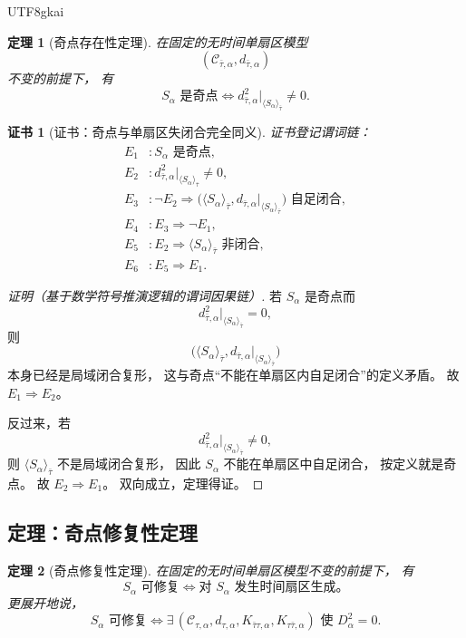 \documentclass[12pt]{article}
\newtheorem{theorem}{定理}[section]
\newtheorem{Certificate}{证书}[section]
\begin{document}
\begin{CJK*}{UTF8}{gkai}
\begin{theorem}[奇点存在性定理]
\label{thm:tex43-cosmology-singularity}
在固定的无时间单扇区模型
\[
  (\mathcal C_{\bar\tau,\alpha},d_{\bar\tau,\alpha})
\]
不变的前提下，
有
\[
  \boxed{
    S_\alpha\text{ 是奇点}
    \iff
    d_{\bar\tau,\alpha}^2\big|_{\langle S_\alpha\rangle_{\bar\tau}}\neq 0.
  }
\]
\end{theorem}

\begin{Certificate}[证书：奇点与单扇区失闭合完全同义]
\label{cert:tex43-cosmology-singularity}
证书登记谓词链：
\[
\begin{aligned}
  E_1 &: S_\alpha\text{ 是奇点},\\
  E_2 &: d_{\bar\tau,\alpha}^2\big|_{\langle S_\alpha\rangle_{\bar\tau}}\neq 0,\\
  E_3 &: \neg E_2 \Rightarrow
         \big(\langle S_\alpha\rangle_{\bar\tau},d_{\bar\tau,\alpha}|_{\langle S_\alpha\rangle_{\bar\tau}}\big)
         \text{ 自足闭合},\\
  E_4 &: E_3 \Rightarrow \neg E_1,\\
  E_5 &: E_2 \Rightarrow \langle S_\alpha\rangle_{\bar\tau}\text{ 非闭合},\\
  E_6 &: E_5 \Rightarrow E_1.
\end{aligned}
\]
\end{Certificate}

\begin{proof}[证明（基于数学符号推演逻辑的谓词因果链）]
若 $S_\alpha$ 是奇点而
\[
  d_{\bar\tau,\alpha}^2\big|_{\langle S_\alpha\rangle_{\bar\tau}}=0,
\]
则
\[
  \big(\langle S_\alpha\rangle_{\bar\tau},d_{\bar\tau,\alpha}|_{\langle S_\alpha\rangle_{\bar\tau}}\big)
\]
本身已经是局域闭合复形，
这与奇点“不能在单扇区内自足闭合”的定义矛盾。
故 $E_1\Rightarrow E_2$。

反过来，若
\[
  d_{\bar\tau,\alpha}^2\big|_{\langle S_\alpha\rangle_{\bar\tau}}\neq 0,
\]
则 $\langle S_\alpha\rangle_{\bar\tau}$ 不是局域闭合复形，
因此 $S_\alpha$ 不能在单扇区中自足闭合，
按定义就是奇点。
故 $E_2\Rightarrow E_1$。
双向成立，定理得证。
\end{proof}

\subsection{定理：奇点修复性定理}
\label{subsec:tex43-ch9-theorem-repair}

\begin{theorem}[奇点修复性定理]
\label{thm:tex43-cosmology-repair}
在固定的无时间单扇区模型不变的前提下，
有
\[
  \boxed{
    S_\alpha\text{ 可修复}
    \iff
    \text{对 }S_\alpha\text{ 发生时间扇区生成。}
  }
\]
更展开地说，
\[
  \boxed{
    S_\alpha\text{ 可修复}
    \iff
    \exists\,
    (\mathcal C_{\tau,\alpha},d_{\tau,\alpha},K_{\bar\tau\tau,\alpha},K_{\tau\bar\tau,\alpha})
    \text{ 使 }D_\alpha^2=0.
  }
\]
\end{theorem}


\end{CJK*}
\end{document}
